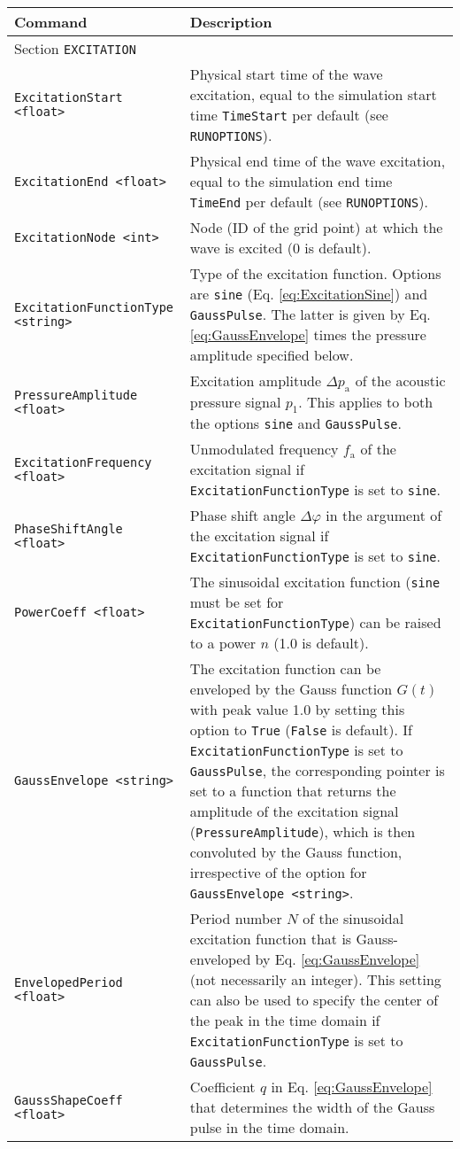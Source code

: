 \noindent
\begin{longtable}{p{} p{}}
\textbf{Command} & \textbf{Description}
\vspace{1mm} \\
\hline Section {\tt EXCITATION} &\\ \hline
{\tt ExcitationStart <float>} & Physical start time of the wave excitation, equal to the simulation start time {\tt TimeStart} per default (see {\tt RUNOPTIONS}). \\
{\tt ExcitationEnd <float>} & Physical end time of the wave excitation, equal to the simulation end time {\tt TimeEnd} per default (see {\tt RUNOPTIONS}). \\
{\tt ExcitationNode <int>} & Node (ID of the grid point) at which the wave is excited (0 is default). \\
{\tt ExcitationFunctionType <string>} & Type of the excitation function. Options are {\tt sine} (Eq. \eqref{eq:ExcitationSine}) and {\tt GaussPulse}. The latter is given by Eq. \eqref{eq:GaussEnvelope} times the pressure amplitude specified below. \\
{\tt PressureAmplitude <float>} & Excitation amplitude $\Delta p_{\mathrm{a}}$ of the acoustic pressure signal $p_1$. This applies to both the options {\tt sine} and {\tt GaussPulse}. \\
{\tt ExcitationFrequency <float>} & Unmodulated frequency $f_{\mathrm{a}}$ of the excitation signal if {\tt ExcitationFunctionType} is set to {\tt sine}. \\
{\tt PhaseShiftAngle <float>} & Phase shift angle $\Delta \varphi$ in the argument of the excitation signal if {\tt ExcitationFunctionType} is set to {\tt sine}. \\
{\tt PowerCoeff <float>} & The sinusoidal excitation function ({\tt sine} must be set for {\tt ExcitationFunctionType}) can be raised to a power $n$ (1.0 is default).\\
{\tt GaussEnvelope <string>} & The excitation function can be enveloped by the Gauss function $G\left(t\right)$ with peak value 1.0 by setting this option to {\tt True} ({\tt False} is default). If {\tt ExcitationFunctionType} is set to {\tt GaussPulse}, the corresponding pointer is set to a function that returns the amplitude of the excitation signal ({\tt PressureAmplitude}), which is then convoluted by the Gauss function, irrespective of the option for {\tt GaussEnvelope <string>}. \\
{\tt EnvelopedPeriod <float>} & Period number $N$ of the sinusoidal excitation function that is Gauss-enveloped by Eq. \eqref{eq:GaussEnvelope} (not necessarily an integer). This setting can also be used to specify the center of the peak in the time domain if {\tt ExcitationFunctionType} is set to {\tt GaussPulse}.\\
{\tt GaussShapeCoeff <float>} & Coefficient $q$ in Eq. \eqref{eq:GaussEnvelope} that determines the width of the Gauss pulse in the time domain. \\
\hline
\end{longtable} \vspace{1em}




